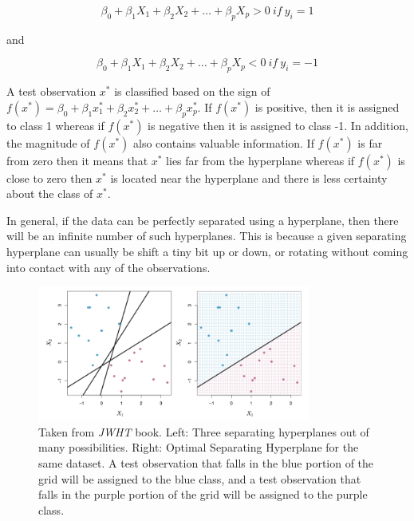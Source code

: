 \begin{equation}
\beta_{0} + \beta_{1}X_{1} + \beta_{2}X_{2} + \dotsc + \beta_{p}X_{p} > 0 \ if \ y_{i} = 1
\end{equation}

\begin{center}and\end{center}

\begin{equation}
\beta_{0} + \beta_{1}X_{1} + \beta_{2}X_{2} + \dotsc + \beta_{p}X_{p} < 0 \ if \ y_{i} = -1
\end{equation}

A test observation $x^{*}$ is classified based on the sign of
$f(x^{*})=\beta_{0}+\beta_{1}x^{*}_{1} + \beta_{2}x^{*}_{2} + \dotsc + \beta_{p}x^{*}_{p}$.
If $f(x^{*})$ is positive, then it is assigned to class 1 whereas if $f(x^{*})$ is negative
then it is assigned to class -1. In addition, the magnitude of $f(x^{*})$ also contains valuable
information.
If $f(x^{*})$ is far from zero then it means that $x^{*}$ lies far from the hyperplane
whereas if $f(x^{*})$ is close to zero then $x^{*}$ is located near the hyperplane and
there is less certainty about the class of $x^{*}$.

In general, if the data can be perfectly separated using a hyperplane, then there will be an
infinite number of such hyperplanes. This is because a given separating hyperplane can usually
be shift a tiny bit up or down, or rotating without coming into contact with any of the
observations.

\begin{figure}[H]
  \centering
  \includegraphics[width=0.8\textwidth]{files/figures/method/max-margin}
  \caption{Taken from \textit{JWHT} \cite{svm_jwht} book.
  Left: Three separating hyperplanes out of many
  possibilities. Right: Optimal Separating Hyperplane for the same dataset. A test observation
  that falls in the blue portion of the grid will be assigned to the blue class, and a test
  observation that falls in the purple portion of the grid will be assigned
  to the purple class.}
  \label{fig:maxMargin}
\end{figure}

